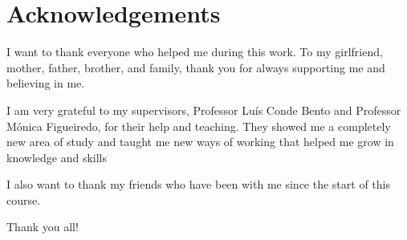 


% 
% 
% 

\begingroup
\let\clearpage\relax
\let\cleardoublepage\relax
\let\cleardoublepage\relax
\chapter*{Acknowledgements}
\color{Red}
I want to thank everyone who helped me during this work. To my girlfriend, mother, father, brother, and family, thank you for always supporting me and believing in me.

I am very grateful to my supervisors, Professor Luís Conde Bento and Professor Mónica Figueiredo, for their help and teaching. They showed me a completely new area of study and taught me new ways of working that helped me grow in knowledge and skills

I also want to thank my friends who have been with me since the start of this course.

Thank you all!
\color{Black}
\endgroup


